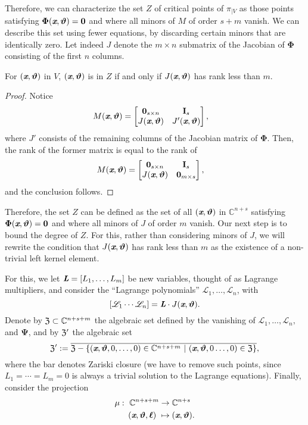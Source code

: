 \documentclass[sigconf]{acmart}
\def\thetab{\bm{\vartheta}}
\def\xb{\textit{\textbf{x}}}
\def\C{\mathbb{C}}
\def\dt{s}
\def\bbm{\begin{bmatrix}}
\def\ebm{\end{bmatrix}}
\begin{document}
Therefore, we can characterize the set $Z$ of critical points of
$\pi_{|V}$ as those points satisfying $\bm\Phi(\xb,\thetab)=\bm 0$ and
where all minors of $M$ of order $\dt+m$ vanish. We can describe this
set using fewer equations, by discarding certain minors that are
identically zero. Let indeed $J$ denote the $m \times n$ submatrix of
the Jacobian of $\bm\Phi$ consisting of the first $n$ columns.
\begin{lemma} 
  For $(\xb,\thetab)$ in $V$, $(\xb,\thetab)$ is in $Z$ if and only if
  $J(\xb,\thetab)$ has rank less than $m$.
\end{lemma}
\begin{proof}
Notice 
%
\begin{align*}
M(\xb,\thetab)&= 
\bbm 
\textbf{0}_{\dt \times n} &\textbf{I}_{\dt} \\
J(\xb,\thetab)     &J'(\xb,\thetab)
\ebm,
\end{align*}
where $J'$ consists of the remaining columns of the Jacobian matrix of
$\bm\Phi$.  Then, the rank of the former matrix is equal to the rank
of
\begin{align*}
M(\xb,\thetab)&= 
\bbm 
\textbf{0}_{\dt \times n} &\textbf{I}_{\dt} \\
J(\xb,\thetab)     & \bm 0_{m \times s}
\ebm,
\end{align*}
and the conclusion follows.
\end{proof}
Therefore, the set $Z$ can be defined as the set of all
$(\xb,\thetab)$ in $\C^{n+\dt}$ satisfying $\bm\Phi(\xb,\thetab)=\bm
0$ and where all minors of $J$ of order $m$ vanish. Our next step is
to bound the degree of $Z$. For this, rather than considering minors
of $J$, we will rewrite the condition that $J(\xb,\thetab)$ has rank
less than $m$ as the existence of a non-trivial left kernel element.

For this, we let $\textit{\textbf{L}}=[L_1,\hdots,L_m]$ be new
variables, thought of as Lagrange multipliers, and consider the
``Lagrange polynomials'' $\mathscr{L}_1,\dots,\mathscr{L}_{n}$, with
\[
[\mathscr{L}_1 \cdots \mathscr{L}_{n}]=\textit{\textbf{L}}\cdot J(\xb,\thetab).
\] 
Denote by $\frak{Z} \subset \C^{n+\dt+m}$ the algebraic set defined by
the vanishing of $\mathscr{L}_1,\hdots,\mathscr{L}_{n},$ and
$\bm\Psi$, and by $\frak{Z}'$ the algebraic set
\[
\frak{Z}' := \overline{\frak{Z} - \{(\xb,\thetab,0,\hdots,0) \in \C^{n+\dt+m}~|~(\xb,\thetab,0\hdots,0) \in \frak{Z}\}},
\]
where the bar denotes Zariski closure (we have to remove such points,
since $L_1=\cdots=L_m=0$ is always a trivial solution to the Lagrange
equations). Finally, consider the projection
\begin{align*} 
\mu :~ \C^{n+\dt+m} &\rightarrow \C^{n+\dt}\\
(\xb,\thetab,\bm \ell)~ &\mapsto (\xb,\thetab).
\end{align*}
\end{document}
